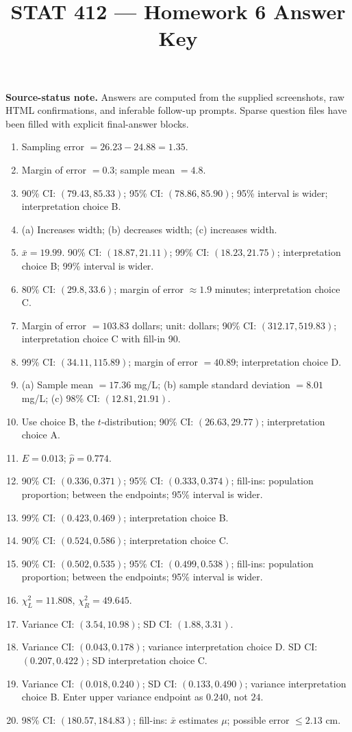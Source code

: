 \documentclass[11pt]{article}
\title{STAT 412 --- Homework 6 Answer Key}
\author{}\date{}
\begin{document}
\maketitle
\noindent\textbf{Source-status note.} Answers are computed from the supplied screenshots, raw HTML confirmations, and inferable follow-up prompts. Sparse question files have been filled with explicit final-answer blocks.

\begin{enumerate}[leftmargin=*,label=\textbf{\arabic*.}]
\item Sampling error $=26.23-24.88=1.35$.
\item Margin of error $=0.3$; sample mean $=4.8$.
\item 90\% CI: $(79.43,85.33)$; 95\% CI: $(78.86,85.90)$; 95\% interval is wider; interpretation choice B.
\item (a) Increases width; (b) decreases width; (c) increases width.
\item $\bar x=19.99$. 90\% CI: $(18.87,21.11)$; 99\% CI: $(18.23,21.75)$; interpretation choice B; 99\% interval is wider.
\item 80\% CI: $(29.8,33.6)$; margin of error $\approx1.9$ minutes; interpretation choice C.
\item Margin of error $=103.83$ dollars; unit: dollars; 90\% CI: $(312.17,519.83)$; interpretation choice C with fill-in 90.
\item 99\% CI: $(34.11,115.89)$; margin of error $=40.89$; interpretation choice D.
\item (a) Sample mean $=17.36$ mg/L; (b) sample standard deviation $=8.01$ mg/L; (c) 98\% CI: $(12.81,21.91)$.
\item Use choice B, the $t$-distribution; 90\% CI: $(26.63,29.77)$; interpretation choice A.
\item $E=0.013$; $\hat p=0.774$.
\item 90\% CI: $(0.336,0.371)$; 95\% CI: $(0.333,0.374)$; fill-ins: population proportion; between the endpoints; 95\% interval is wider.
\item 99\% CI: $(0.423,0.469)$; interpretation choice B.
\item 90\% CI: $(0.524,0.586)$; interpretation choice C.
\item 90\% CI: $(0.502,0.535)$; 95\% CI: $(0.499,0.538)$; fill-ins: population proportion; between the endpoints; 95\% interval is wider.
\item $\chi^2_L=11.808$, $\chi^2_R=49.645$.
\item Variance CI: $(3.54,10.98)$; SD CI: $(1.88,3.31)$.
\item Variance CI: $(0.043,0.178)$; variance interpretation choice D. SD CI: $(0.207,0.422)$; SD interpretation choice C.
\item Variance CI: $(0.018,0.240)$; SD CI: $(0.133,0.490)$; variance interpretation choice B. Enter upper variance endpoint as $0.240$, not $24$.
\item 98\% CI: $(180.57,184.83)$; fill-ins: $\bar x$ estimates $\mu$; possible error $\le2.13$ cm.
\end{enumerate}
\end{document}
